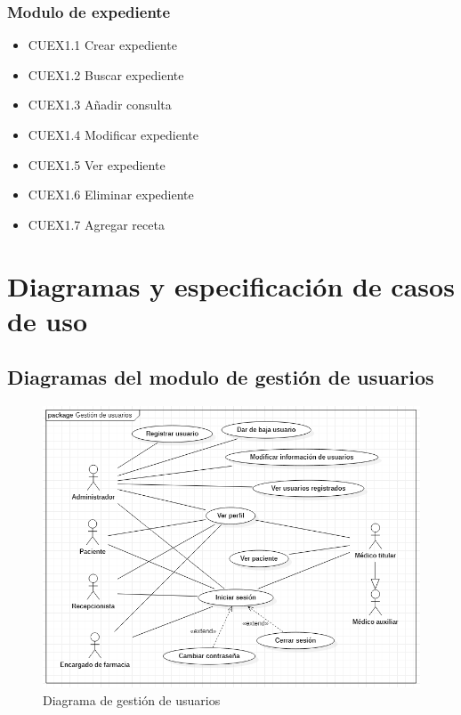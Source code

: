 \documentclass[12pt,letterpaper]{article}
\begin{document}
                \subsubsection{Modulo de expediente}
                    \begin{itemize}
                        \item CUEX1.1 Crear expediente 
                        \item CUEX1.2 Buscar expediente 
                        \item CUEX1.3 Añadir consulta 
                        \item CUEX1.4 Modificar expediente 
                        \item CUEX1.5 Ver expediente 
                        \item CUEX1.6 Eliminar expediente 
                        \item CUEX1.7 Agregar receta
                    \end{itemize}

    \section{Diagramas y especificación de casos de uso}
        \subsection{Diagramas del modulo de gestión de usuarios}
            \begin{figure}[H]
                \centering
                \includegraphics [scale=0.5]{casosUso/gestionUsuarios}
                \caption{Diagrama de gestión de usuarios}
            \end{figure}
\end{document}
